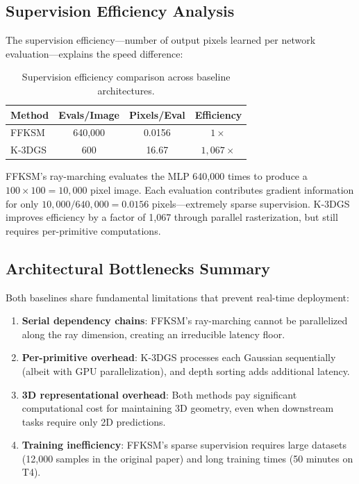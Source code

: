 \documentclass[12pt,a4paper,oneside]{report}
\begin{document}
\subsection{Supervision Efficiency Analysis}
The supervision efficiency---number of output pixels learned per network evaluation---explains the speed difference:
\begin{table}[H]
\centering
\caption{Supervision efficiency comparison across baseline architectures.}
\label{tab:supervision_efficiency_baseline}
\begin{tabular}{lccc}
\toprule
\textbf{Method} & \textbf{Evals/Image} & \textbf{Pixels/Eval} & \textbf{Efficiency} \\
\midrule
FFKSM & 640,000 & 0.0156 & $1\times$ \\
K-3DGS & 600 & 16.67 & $1,067\times$ \\
\bottomrule
\end{tabular}
\end{table}

FFKSM's ray-marching evaluates the MLP 640,000 times to produce a $100 \times 100 = 10,000$ pixel image. Each evaluation contributes gradient information for only $10,000 / 640,000 = 0.0156$ pixels---extremely sparse supervision. K-3DGS improves efficiency by a factor of 1,067 through parallel rasterization, but still requires per-primitive computations.

\subsection{Architectural Bottlenecks Summary}
Both baselines share fundamental limitations that prevent real-time deployment:
\begin{enumerate}
    \item \textbf{Serial dependency chains}: FFKSM's ray-marching cannot be parallelized along the ray dimension, creating an irreducible latency floor.
    \item \textbf{Per-primitive overhead}: K-3DGS processes each Gaussian sequentially (albeit with GPU parallelization), and depth sorting adds additional latency.
    \item \textbf{3D representational overhead}: Both methods pay significant computational cost for maintaining 3D geometry, even when downstream tasks require only 2D predictions.
    \item \textbf{Training inefficiency}: FFKSM's sparse supervision requires large datasets (12,000 samples in the original paper) and long training times (50 minutes on T4).
\end{enumerate}
\end{document}
